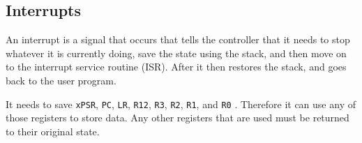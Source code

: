 \documentclass[12pt,letterpaper]{article} \usepackage{amsmath} \usepackage{graphicx} \usepackage[margin=1in]{geometry} \usepackage{longtable}  \usepackage{amssymb}
\begin{document}
	\subsection{Interrupts}
	An interrupt is a signal that occurs that tells the controller that it needs to stop whatever it is currently doing, save the state using the stack, and then move on to the interrupt service routine (ISR). After it then restores the stack, and goes back to the user program.
	
	It needs to save \verb*|xPSR|, \verb*|PC|, \verb*|LR|, \verb*|R12|, \verb*|R3|, \verb*|R2|, \verb*|R1|, and \verb*|R0| . Therefore it can use any of those registers to store data. Any other registers that are used must be returned to their original state. 
	
	
	
	
\end{document}
